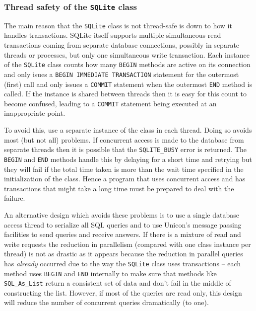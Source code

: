 \subsubsection{Thread safety of the \texttt{SQLite} class}
\label{SQLite_ThreadSafety}
The main reason that the \texttt{SQLite} class is not thread-safe is down to how
\WarningNotThreadSafe it handles transactions. SQLite itself supports multiple
simultaneous read transactions coming from separate database connections,
possibly in separate threads or processes, but only one simultaneous write
transaction. Each instance of the \texttt{SQLite} class counts how many
\texttt{BEGIN} methods are active on its connection and only isues a
\texttt{BEGIN IMMEDIATE TRANSACTION} statement for the outermost (first) call
and only issues a \texttt{COMMIT} statement when the outermost \texttt{END}
method is called.  If the instance is shared between threads then it is easy for
this count to become confused, leading to a \texttt{COMMIT} statement being
executed at an inappropriate point.

To avoid this, use a separate instance of the class in each thread. Doing so
avoids most (but not all) problems. If concurrent access is made to the database
from separate threads then it is possible that the \texttt{SQLITE\_BUSY} error
is returned.  The \texttt{BEGIN} and \texttt{END} methods handle this by
delaying for a short time and retrying but they will fail if the total time
taken is more than the wait time specified in the initialization of the
\label{SQLite_Timeout}
class. Hence a program that uses concurrent access and has transactions that
might take a long time must be prepared to deal with the failure.

An alternative design which avoids these problems is to use a single database
access thread to serialize all SQL queries and to use Unicon's message passing
facilities to send queries and receive answers.  If there is a mixture of read
and write requests the reduction in parallelism (compared with one class
instance per thread) is not as drastic as it appears because the reduction in
parallel queries has {\em already\/} occurred due to the way the \texttt{SQLite}
class uses transactions -- each method uses \texttt{BEGIN} and \texttt{END}
internally to make sure that methods like \texttt{SQL\_As\_List} return a
consistent set of data and don't fail in the middle of constructing the list.
However, if most of the queries are read only, this design will reduce the number
of concurrent queries dramatically (to one).

